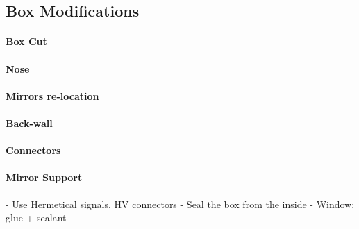 \subsection{Box Modifications}





\paragraph{Box Cut}
\paragraph{Nose}
\paragraph{Mirrors re-location}
\paragraph{Back-wall}
\paragraph{Connectors}
\paragraph{Mirror Support}



- Use Hermetical signals, HV connectors
- Seal the box from the inside
- Window: glue + sealant




